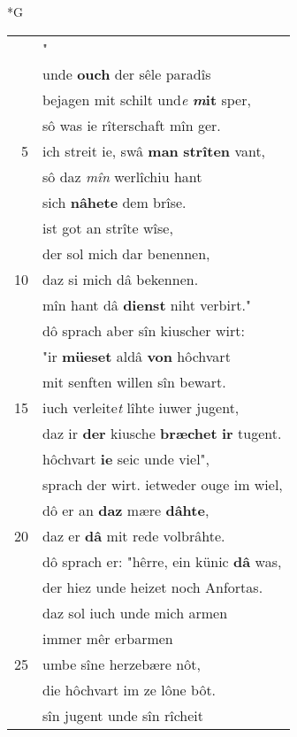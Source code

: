 \documentclass[8pt,a4paper,notitlepage]{article}
\begin{document}
\begin{table}[ht]
\begin{minipage}[t]{0.5\linewidth}
\small
\begin{center}*G
\end{center}
\begin{tabular}{rl}
 & "\textbf{\begin{large}N\end{large}âch} rîterschaft, des lîbes prîs\\ 
 & unde \textbf{ouch} der sêle paradîs\\ 
 & bejagen mit schilt und\textit{e} \textbf{\textit{m}it} sper,\\ 
 & sô was ie rîterschaft mîn ger.\\ 
5 & ich streit ie, swâ \textbf{man} \textbf{strîten} vant,\\ 
 & sô daz \textit{mîn} werlîchiu hant\\ 
 & sich \textbf{nâhete} dem brîse.\\ 
 & ist got an strîte wîse,\\ 
 & der sol mich dar benennen,\\ 
10 & daz si mich dâ bekennen.\\ 
 & mîn hant dâ \textbf{dienst} niht verbirt."\\ 
 & dô sprach aber sîn kiuscher wirt:\\ 
 & "ir \textbf{müeset} aldâ \textbf{von} hôchvart\\ 
 & mit senften willen sîn bewart.\\ 
15 & iuch verleite\textit{t} lîhte iuwer jugent,\\ 
 & daz ir \textbf{der} kiusche \textbf{bræchet} \textbf{ir} tugent.\\ 
 & hôchvart \textbf{ie} seic unde viel",\\ 
 & sprach der wirt. ietweder ouge im wiel,\\ 
 & dô er an \textbf{daz} mære \textbf{dâhte},\\ 
20 & daz er \textbf{dâ} mit rede volbrâhte.\\ 
 & dô sprach er: "hêrre, ein künic \textbf{dâ} was,\\ 
 & der hiez unde heizet noch Anfortas.\\ 
 & daz sol iuch unde mich armen\\ 
 & immer mêr erbarmen\\ 
25 & umbe sîne herzebære nôt,\\ 
 & die hôchvart im ze lône bôt.\\ 
 & sîn jugent unde sîn rîcheit\\ 

\end{tabular}
\end{minipage}
\end{table}
\end{document}

